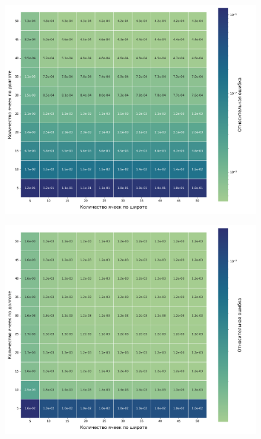  \begin{figure}[h!]
    \centering
    \includegraphics[width=0.85\linewidth]{../images/solution/atmo/2735_heatmap.png}
    \label{fig:atmo:2735_heatmap}
 \end{figure}

 \begin{figure}[h!]
    \centering
    \includegraphics[width=0.85\linewidth]{../images/solution/atmo/2753_heatmap.png}
    \label{fig:atmo:2753_heatmap}
 \end{figure}

